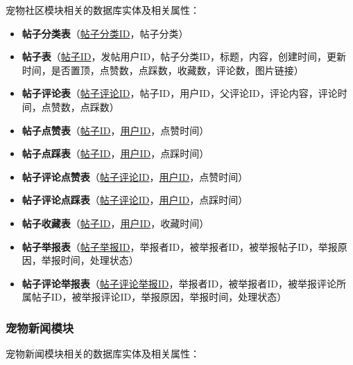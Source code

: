 宠物社区模块相关的数据库实体及相关属性：

\begin{itemize}
    \item \textbf{帖子分类表}（\underline{帖子分类ID}，帖子分类）
    \item \textbf{帖子表}（\underline{帖子ID}，发帖用户ID，帖子分类ID，标题，内容，创建时间，更新时间，是否置顶，点赞数，点踩数，收藏数，评论数，图片链接）
    \item \textbf{帖子评论表}（\underline{帖子评论ID}，帖子ID，用户ID，父评论ID，评论内容，评论时间，点赞数，点踩数）
    \item \textbf{帖子点赞表}（\underline{帖子ID}，\underline{用户ID}，点赞时间）
    \item \textbf{帖子点踩表}（\underline{帖子ID}，\underline{用户ID}，点踩时间）
    \item \textbf{帖子评论点赞表}（\underline{帖子评论ID}，\underline{用户ID}，点赞时间）
    \item \textbf{帖子评论点踩表}（\underline{帖子评论ID}，\underline{用户ID}，点踩时间）
    \item \textbf{帖子收藏表}（\underline{帖子ID}，\underline{用户ID}，收藏时间）
    \item \textbf{帖子举报表}（\underline{帖子举报ID}，举报者ID，被举报者ID，被举报帖子ID，举报原因，举报时间，处理状态）
    \item \textbf{帖子评论举报表}（\underline{帖子评论举报ID}，举报者ID，被举报者ID，被举报评论所属帖子ID，被举报评论ID，举报原因，举报时间，处理状态）
\end{itemize}

\subsubsection{宠物新闻模块}

宠物新闻模块相关的数据库实体及相关属性：

